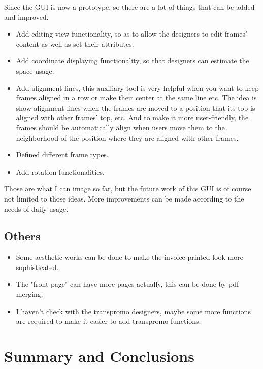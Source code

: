 \documentclass[12pt,twoside,a4paper]{report}
\begin{document}
  Since the GUI is now a prototype, so there are a lot of things that can be added and improved.

\begin{itemize}

\item Add editing view functionality, so as to allow the designers to edit frames' content as well as set their attributes. 
\item Add coordinate displaying functionality, so that designers can estimate the space usage. 
\item Add alignment lines, this auxiliary tool is very helpful when you want to keep frames aligned in a row or make their center at the same line etc. The idea is show alignment lines when the frames are moved to a position that its top is aligned with other frames' top, etc. And to make it more user-friendly, the frames should be automatically align when users move them to the neighborhood of the position where they are aligned with other frames.
\item Defined different frame types.
\item Add rotation functionalities.

\end{itemize}

  Those are what I can image so far, but the future work of this GUI is of course not limited to those ideas. More improvements can be made according to the needs of daily usage.

\section{Others}

\begin{itemize}

\item Some aesthetic works can be done to make the invoice printed look more sophisticated.
\item The "front page" can have more pages actually, this can be done by pdf merging. 
\item I haven't check with the transpromo designers, maybe some more functions are required to make it easier to add transpromo functions. 

\end{itemize}

\chapter{Summary and Conclusions}
\end{document}
